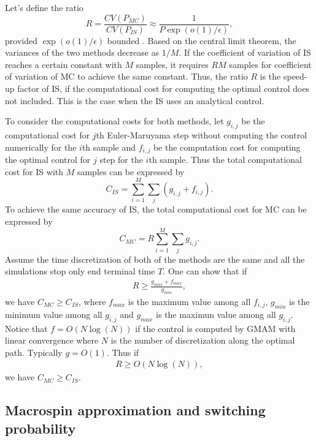 \documentclass[journal,transmag]{IEEEtran}
\begin{document}
Let's define the ratio
\begin{equation}
R = \frac{CV(P_{MC}) }{CV(P_{IS}) } \approx \frac{1}{P \exp(o(1)/\epsilon)},
\end{equation}
provided $\exp(o(1)/\epsilon)$ bounded \cite{RES_Eric}. Based on the central limit theorem, the variances of the two methods decrease as $1/M$. If the coefficient of variation of IS reaches a certain constant with $M$ samples, it requires $R M$ samples for coefficient of variation of MC to achieve the same constant. Thus, the ratio $R$ is the speed-up factor of IS, if the computational cost for computing the optimal control does not included. This is the case when the IS uses an analytical control.

To consider the computational costs for both methods, let  $g_{i,j}$ be the computational cost for $j$th Euler-Maruyama step without computing the control numerically for the $i$th sample and  $f_{i,j}$ be the computation cost for computing the optimal control for $j$ step for the $i$th sample. Thus the total computational cost for IS with $M$ samples can be expressed by
\begin{equation}
C_{IS} =\sum_{i = 1}^M \sum_j (g_{i,j} + f_{i,j}).
\end{equation}
To achieve the same accuracy of IS, the total computational cost for MC can be expressed by
\begin{equation}
C_{MC} =R \sum_{i = 1}^M \sum_j g_{i,j}.
\end{equation}
Assume the time discretization of both of the methods are the same and all the simulations stop only end terminal time $T$. One can show that if
\begin{eqnarray}
R \ge \frac{g_{max}+f_{max}}{g_{min}},
\end{eqnarray}
we have $ C_{MC} \ge C_{IS}$, where $f_{max}$ is the maximum value among all $f_{i,j}$, $g_{min}$ is the minimum value among all $g_{i,j}$ and $g_{max}$ is the maximun value among all $g_{i,j}$. Notice that $f = O(N \log (N))$ if the control is computed by GMAM with linear convergence where $N$ is the number of discretization along the optimal path. Typically $g = O(1)$. Thus if
\begin{eqnarray}
R \ge  O(N \log (N)),
\end{eqnarray}
we have $ C_{MC} \ge C_{IS}$.

\subsection{Macrospin approximation and switching probability}
\end{document}
